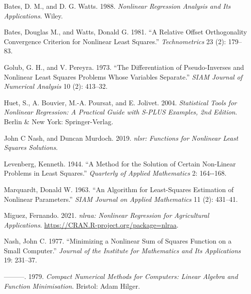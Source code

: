 \documentclass[
]{article}
\newlength{\cslhangindent}
\newlength{\cslentryspacingunit} %
\newenvironment{CSLReferences}[2] %
 {%
  \setlength{\parindent}{0pt}
  \ifodd #1
  \let\oldpar\par
  \def\par{\hangindent=\cslhangindent\oldpar}
  \fi
  \setlength{\parskip}{#2\cslentryspacingunit}
 }%
 {}
\begin{document}
\hypertarget{refs}{}
\begin{CSLReferences}{1}{0}
\leavevmode{}%
Bates, D. M., and D. G. Watts. 1988. \emph{Nonlinear Regression Analysis
and Its Applications}. Wiley.

\leavevmode{}%
Bates, Douglas M., and Watts, Donald G. 1981. {``A Relative Offset
Orthogonality Convergence Criterion for Nonlinear Least Squares.''}
\emph{Technometrics} 23 (2): 179--83.

\leavevmode{}%
Golub, G. H., and V. Pereyra. 1973. {``The Differentiation of
Pseudo-Inverses and Nonlinear Least Squares Problems Whose Variables
Separate.''} \emph{SIAM Journal of Numerical Analysis} 10 (2): 413--32.

\leavevmode{}%
Huet, S., A. Bouvier, M.-A. Poursat, and E. Jolivet. 2004.
\emph{Statistical Tools for Nonlinear Regression: A Practical Guide with
{S-PLUS} Examples, 2nd Edition}. Berlin \& New York: Springer-Verlag.

\leavevmode{}%
John C Nash, and Duncan Murdoch. 2019. \emph{{nlsr: Functions for
Nonlinear Least Squares Solutions}}.

\leavevmode{}%
Levenberg, Kenneth. 1944. {``A Method for the Solution of Certain
Non-Linear Problems in Least Squares.''} \emph{Quarterly of Applied
Mathematics} 2: 164-\/-168.

\leavevmode{}%
Marquardt, Donald W. 1963. {``{An Algorithm for Least-Squares Estimation
of Nonlinear Parameters}.''} \emph{SIAM Journal on Applied Mathematics}
11 (2): 431--41.

\leavevmode{}%
Miguez, Fernando. 2021. \emph{{nlraa: Nonlinear Regression for
Agricultural Applications}}.
\url{https://CRAN.R-project.org/package=nlraa}.

\leavevmode{}%
Nash, John C. 1977. {``Minimizing a Nonlinear Sum of Squares Function on
a Small Computer.''} \emph{Journal of the Institute for Mathematics and
Its Applications} 19: 231--37.

\leavevmode{}%
---------. 1979. \emph{Compact Numerical Methods for Computers: Linear
Algebra and Function Minimisation}. Bristol: Adam Hilger.


\end{CSLReferences}
\end{document}
